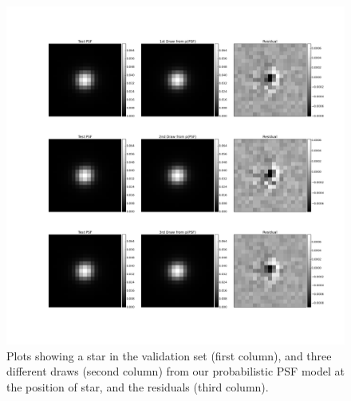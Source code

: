 \documentclass[12pt]{article}
\begin{document}
\begin{figure}[!htb]
  \includegraphics[width=\linewidth]{112.png}
\endminipage
\caption{Plots showing a star in the validation set
(first column), and three different draws (second column)
from our probabilistic PSF model at the
position of star, and the residuals (third column).\label{1}}
\end{figure}
\end{document}
